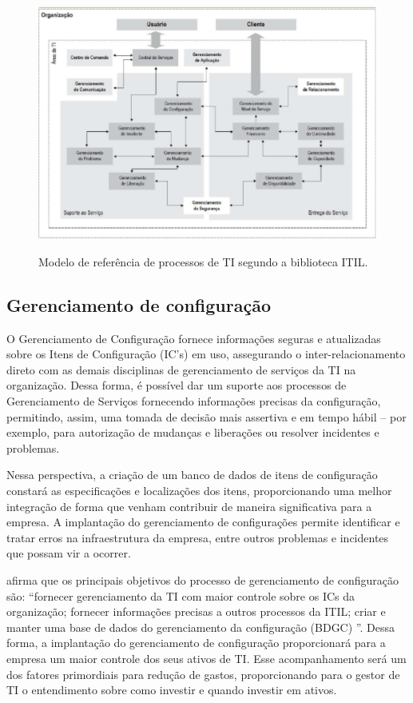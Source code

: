 \documentclass[eso]{bcc}
\begin{document}
\newpage

\begin{figure}[!h]
\centering
\caption[Modelo de referência]{Modelo de referência de processos de TI segundo a biblioteca ITIL.}
\includegraphics[scale=1]{Figuras/modelo.png}
\label{UCmodelo}
\end{figure}

\subsection{Gerenciamento de configuração}

O Gerenciamento de Configuração fornece informações seguras e atualizadas sobre os Itens de Configuração (IC's) em uso, assegurando o inter-relacionamento direto com as demais disciplinas de gerenciamento de serviços da TI na organização. Dessa forma, é possível dar um suporte aos processos de Gerenciamento de Serviços fornecendo informações precisas da configuração, permitindo, assim, uma tomada de decisão mais assertiva e em tempo hábil – por exemplo, para autorização de mudanças e liberações ou resolver incidentes e problemas.

Nessa perspectiva, a criação de um banco de dados de itens de configuração constará as especificações e localizações dos itens, proporcionando uma melhor integração de forma que venham contribuir de maneira significativa para a empresa. A implantação do gerenciamento de configurações permite identificar e tratar erros na infraestrutura da empresa, entre outros problemas e incidentes que possam vir a ocorrer. 

\cite[p.90]{filho:2011} afirma que os principais objetivos do processo de gerenciamento de configuração são: “fornecer gerenciamento da TI com maior controle sobre os ICs da organização; fornecer informações precisas a outros processos da ITIL; criar e manter uma base de dados do gerenciamento da configuração (BDGC) ”. Dessa forma, a implantação do gerenciamento de configuração proporcionará para a empresa um maior controle dos seus ativos de TI. Esse acompanhamento será um dos fatores primordiais para redução de gastos, proporcionando para o gestor de TI o entendimento sobre como investir e quando investir em ativos.
\end{document}
